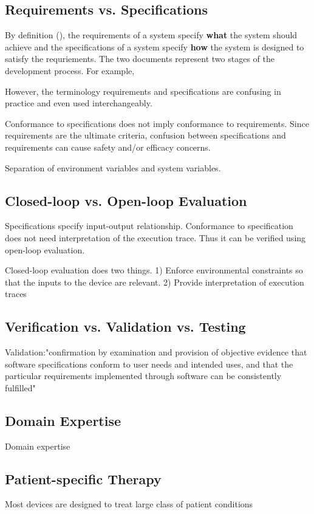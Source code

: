 \subsection{Requirements vs. Specifications}
By definition (\cite{fda3}), the requirements of a system specify \textbf{what} the system should achieve and the specifications of a system specify \textbf{how} the system is designed to satisfy the requriements. The two documents represent two stages of the development process. For example,

However, the terminology requirements and specifications are confusing in practice and even used interchangeably. \cite{reqVSspec} 

Conformance to specifications does not imply conformance to requirements. Since requirements are the ultimate criteria, confusion between specifications and requirements can cause safety and/or efficacy concerns.

Separation of environment variables and system variables.
\subsection{Closed-loop vs. Open-loop Evaluation}
Specifications specify input-output relationship. Conformance to specification does not need interpretation of the execution trace. Thus it can be verified using open-loop evaluation.

Closed-loop evaluation does two things. 1) Enforce environmental constraints so that the inputs to the device are relevant. 2) Provide interpretation of execution traces 

\subsection{Verification vs. Validation vs. Testing}

Validation:"confirmation by examination and provision of objective evidence that software specifications conform to user needs and intended uses, and that the particular requirements implemented through software can be consistently fulfilled"\cite{ISO8402,fda2}
\subsection{Domain Expertise}
Domain expertise 
\subsection{Patient-specific Therapy}
Most devices are designed to treat large class of patient conditions
